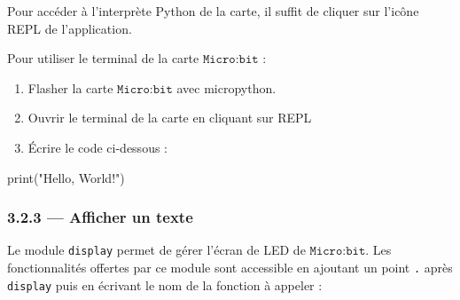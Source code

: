 \documentclass[a4paper,17pt]{extarticle}
\providecommand{\tightlist}{%
      \setlength{\itemsep}{0pt}\setlength{\parskip}{0pt}}
\newenvironment{Shaded}{}{}
\newcommand{\StringTok}[1]{\textcolor[rgb]{0.25,0.44,0.63}{{#1}}}
\newcommand{\NormalTok}[1]{{#1}}
\newcommand{\BuiltInTok}[1]{{#1}}
\begin{document}
Pour accéder à l'interprète Python de la carte, il suffit de cliquer sur
l'icône REPL de l'application.
\begin{exemple}
    Pour utiliser le terminal de la carte \(\texttt{Micro:bit}\) :

\begin{enumerate}
\def\labelenumi{\arabic{enumi}.}
\tightlist
\item
  Flasher la carte \(\texttt{Micro:bit}\) avec micropython.
\item
  Ouvrir le terminal de la carte en cliquant sur REPL
\item
  Écrire le code ci-dessous :
\end{enumerate}

\begin{Shaded}
\begin{Highlighting}[]
\BuiltInTok{print}\NormalTok{(}\StringTok{"Hello, World!"}\NormalTok{)}
\end{Highlighting}
\end{Shaded}

        \end{exemple}
    \hypertarget{afficher-un-texte}{%
\subsubsection{3.2.3 --- Afficher un texte}\label{afficher-un-texte}}

    Le module \texttt{display} permet de gérer l'écran de LED de
\(\texttt{Micro:bit}\). Les fonctionnalités offertes par ce module sont
accessible en ajoutant un point
\texttt{\textquotesingle{}.\textquotesingle{}} après
\texttt{\textquotesingle{}display\textquotesingle{}} puis en écrivant le
nom de la fonction à appeler :
\end{document}
